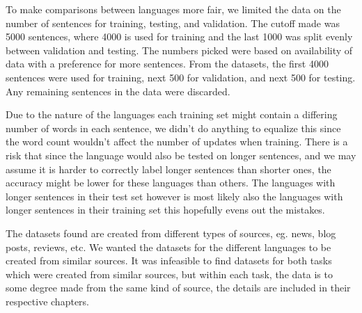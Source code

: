 To make comparisons between languages more fair, we limited the data on the
number of sentences for training, testing, and validation. The cutoff made was
5000 sentences, where 4000 is used for training and the last 1000 was split
evenly between validation and testing. The numbers picked were based on
availability of data with a preference for more sentences. From the datasets,
the first 4000 sentences were used for training, next 500 for validation, and
next 500 for testing. Any remaining sentences in the data were discarded.

Due to the nature of the languages each training set might contain a differing
number of words in each sentence, we didn't do anything to equalize this since
the word count wouldn't affect the number of updates when training. There is a
risk that since the language would also be tested on longer sentences, and we
may assume it is harder to correctly label longer sentences than shorter ones,
the accuracy might be lower for these languages than others. The languages with
longer sentences in their test set however is most likely also the languages
with longer sentences in their training set this hopefully evens out the
mistakes.

The datasets found are created from different types of sources, eg. news, blog
posts, reviews, etc. We wanted the datasets for the different languages to be
created from similar sources. It was infeasible to find datasets for both tasks
which were created from similar sources, but within each task, the data is to
some degree made from the same kind of source, the details are included in their
respective chapters.


\pagebreak